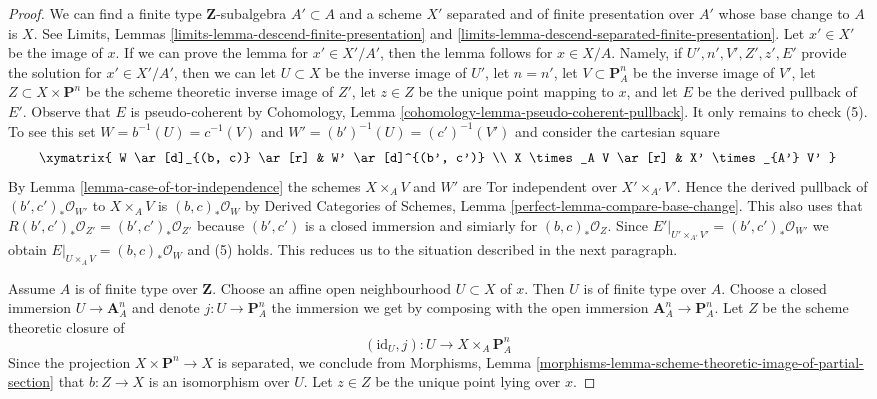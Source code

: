 \begin{proof}
We can find a finite type $\mathbf{Z}$-subalgebra $A' \subset A$
and a scheme $X'$ separated and of finite presentation over $A'$
whose base change to $A$ is $X$. See
Limits, Lemmas \ref{limits-lemma-descend-finite-presentation} and
\ref{limits-lemma-descend-separated-finite-presentation}.
Let $x' \in X'$ be the image of $x$.
If we can prove the lemma for $x' \in X'/A'$, then
the lemma follows for $x \in X/A$.
Namely, if $U', n', V', Z', z', E'$ provide the solution
for $x' \in X'/A'$, then we can let
$U \subset X$ be the inverse image of $U'$,
let $n = n'$,
let $V \subset \mathbf{P}^n_A$ be the inverse image of $V'$,
let $Z \subset X \times \mathbf{P}^n$ be
the scheme theoretic inverse image of $Z'$,
let $z \in Z$ be the unique point mapping to $x$, and
let $E$ be the derived pullback of $E'$.
Observe that $E$ is pseudo-coherent by
Cohomology, Lemma \ref{cohomology-lemma-pseudo-coherent-pullback}.
It only remains to check (5). To see this
set $W = b^{-1}(U) = c^{-1}(V)$ and $W' = (b')^{-1}(U) = (c')^{-1}(V')$ 
and consider the cartesian square
$$
\xymatrix{
W \ar[d]_{(b, c)} \ar[r] & W' \ar[d]^{(b', c')} \\
X \times_A V \ar[r] & X' \times_{A'} V'
}
$$
By Lemma \ref{lemma-case-of-tor-independence} the schemes
$X \times_A V$ and $W'$ are Tor independent over $X' \times_{A'} V'$.
Hence the derived pullback of
$(b', c')_*\mathcal{O}_{W'}$ to $X \times_A V$
is $(b, c)_*\mathcal{O}_W$ by
Derived Categories of Schemes,
Lemma \ref{perfect-lemma-compare-base-change}.
This also uses that $R(b', c')_*\mathcal{O}_{Z'} = (b', c')_*\mathcal{O}_{Z'}$
because $(b', c')$ is a closed immersion and simiarly for
$(b, c)_*\mathcal{O}_Z$.
Since $E'|_{U' \times_{A'} V'} =
(b', c')_*\mathcal{O}_{W'}$ we obtain
$E|_{U \times_A V} = (b, c)_*\mathcal{O}_W$
and (5) holds.
This reduces us to the situation described in the next
paragraph.

\medskip\noindent
Assume $A$ is of finite type over $\mathbf{Z}$.
Choose an affine open neighbourhood $U \subset X$ of $x$.
Then $U$ is of finite type over $A$.
Choose a closed immersion $U \to \mathbf{A}^n_A$ and denote
$j : U \to \mathbf{P}^n_A$ the immersion we get by composing
with the open immersion $\mathbf{A}^n_A \to \mathbf{P}^n_A$.
Let $Z$ be the scheme theoretic closure of
$$
(\text{id}_U, j) : U \longrightarrow X \times_A \mathbf{P}^n_A
$$
Since the projection $X \times \mathbf{P}^n \to X$ is separated,
we conclude from Morphisms, Lemma
\ref{morphisms-lemma-scheme-theoretic-image-of-partial-section}
that $b : Z \to X$ is an isomorphism over $U$.
Let $z \in Z$ be the unique point lying over $x$.


\end{proof}
